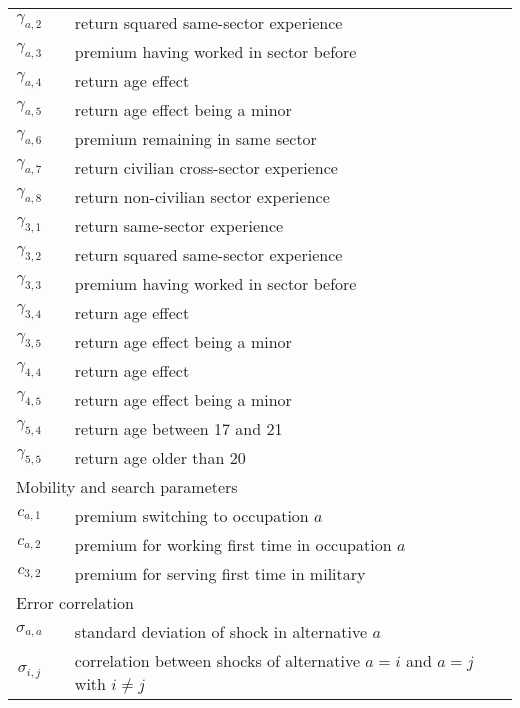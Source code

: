 \begin{ThreePartTable}
\begin{longtable}{@{}cll@{}}
		$\gamma_{a,2}$       &  & return squared same-sector experience         								\\
		$\gamma_{a,3}$       &  & premium having worked in sector before        							   \\
		$\gamma_{a,4}$       &  & return age effect                             											     \\
		$\gamma_{a,5}$       &  & return age effect being a minor               										\\
		$\gamma_{a,6}$       &  & premium remaining in same sector              								   \\
		$\gamma_{a,7}$       &  & return civilian cross-sector experience       								    \\
		$\gamma_{a,8}$       &  & return non-civilian sector experience       										 \\
		$\gamma_{3,1}$       &  & return same-sector experience                 									  \\
		$\gamma_{3,2}$       &  & return squared same-sector experience    										 \\
		$\gamma_{3,3}$       &  & premium having worked in sector before   										\\
		$\gamma_{3,4}$       &  & return age effect                             												 \\
		$\gamma_{3,5}$       &  & return age effect being a minor              	   										\\
		$\gamma_{4,4}$       &  & return age effect                             												 \\
		$\gamma_{4,5}$       &  & return age effect being a minor                  										\\
		$\gamma_{5,4}$       &  & return age between 17 and 21                 	  									   \\
		$\gamma_{5,5}$       &  & return age older than 20							   										\\[7.5pt] \midrule
		\multicolumn{3}{l}{Mobility and search parameters}          													  \\ \midrule
		$c_{a,1}$            &  & premium switching to occupation $a$           									   \\
		$c_{a,2}$            &  & premium for working first time in occupation $a$         										  \\
		$c_{3,2}$            &  & premium for serving first time in military    										  \\[7.5pt] \midrule
		\multicolumn{3}{l}{Error correlation}          													  									\\ \midrule
		$\sigma_{a,a}$	&	& standard deviation of shock in alternative $a$									\\
		$\sigma_{i,j}$ &	& correlation between shocks of alternative $a = i$ and $a=j$ with $i \neq j$ \\
		
	\end{longtable}
\end{ThreePartTable}